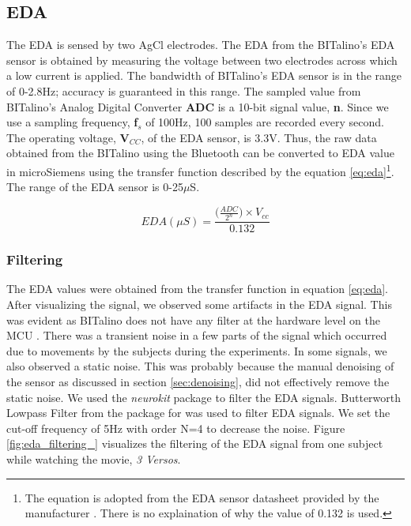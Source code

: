 \subsection{EDA}
\label{sec:eda_feature_extraction}
The EDA is sensed by two AgCl electrodes. The EDA from the BITalino's EDA sensor is obtained by measuring the voltage between two electrodes across which a low current is applied. The bandwidth of BITalino's EDA sensor is in the range of 0-2.8Hz; accuracy is guaranteed in this range. The sampled value from BITalino's Analog Digital Converter \textbf{ADC} is a 10-bit signal value, \textbf{n}. Since we use a sampling frequency, \textbf{f$_{s}$} of 100Hz, 100 samples are recorded every second. The operating voltage, \textbf{V$_{CC}$}, of the EDA sensor, is 3.3V. Thus, the raw data obtained from the BITalino using the Bluetooth can be converted to EDA value in microSiemens using the transfer function described by the equation \ref{eq:eda}\footnote{The equation is adopted from the EDA sensor datasheet provided by the manufacturer \cite{eda_datasheet}. There is no explaination of why the value of 0.132 is used.}. The range of the EDA sensor is 0-25$\mu$S. 


\begin{equation}
\label{eq:eda}
    EDA(\mu S) = \frac{\big(\frac{ADC}{2^n}) \times V_{cc}}{0.132}
\end{equation}

\subsubsection{Filtering} The EDA values were obtained from the transfer function in equation \ref{eq:eda}. After visualizing the signal, we observed some artifacts in the EDA signal. This was evident as BITalino does not have any filter at the hardware level on the MCU \cite{noauthor_faq_nodate}. There was a transient noise in a few parts of the signal which occurred due to movements by the subjects during the experiments. In some signals, we also observed a static noise. This was probably because the manual denoising of the sensor as discussed in section \ref{sec:denoising}, did not effectively remove the static noise. We used the \textit{neurokit} \cite{noauthor_python_2019} package to filter the EDA signals. Butterworth Lowpass Filter from the package for was used to filter EDA signals. We set the cut-off frequency of 5Hz with order N=4 to decrease the noise. Figure \ref{fig:eda_filtering_} visualizes the filtering of the EDA signal from one subject while watching the movie, \textit{3 Versos}.

